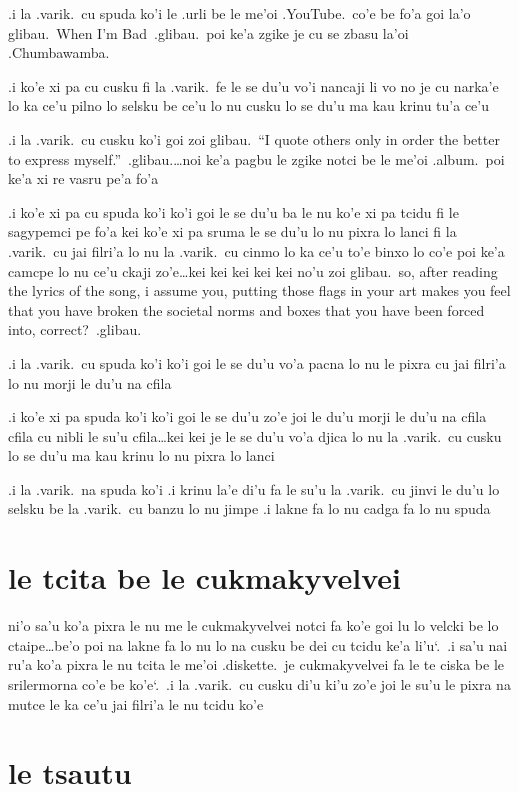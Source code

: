 \documentclass{report}
\newcommand\sds{\spacefactor\sfcode`.\ \space}
\begin{document}
.i la .varik.\ cu spuda ko'i le .urli be le me'oi .YouTube.\ co'e be fo'a goi la'o glibau.\ When I'm Bad\ .glibau.\ poi ke'a zgike je cu se zbasu la'oi .Chumbawamba.

.i ko'e xi pa cu cusku fi la .varik.\ fe le se du'u vo'i nancaji li vo no je cu narka'e lo ka ce'u pilno lo selsku be ce'u lo nu cusku lo se du'u ma kau krinu tu'a ce'u

.i la .varik.\ cu cusku ko'i goi zoi glibau.\ ``I quote others only in order the better to express myself.''\ .glibau.\ldots noi ke'a pagbu le zgike notci be le me'oi .album.\ poi ke'a xi re vasru pe'a fo'a

.i ko'e xi pa cu spuda ko'i ko'i goi le se du'u ba le nu ko'e xi pa tcidu fi le sagypemci pe fo'a kei ko'e xi pa sruma le se du'u lo nu pixra lo lanci fi la .varik.\ cu jai filri'a lo nu la .varik.\ cu cinmo lo ka ce'u to'e binxo lo co'e poi ke'a camcpe lo nu ce'u ckaji zo'e\ldots kei kei kei kei kei no'u zoi glibau.\ so, after reading the lyrics of the song, i assume you, putting those flags in your art makes you feel that you have broken the societal norms and boxes that you have been forced into, correct?\ .glibau.

.i la .varik.\ cu spuda ko'i ko'i goi le se du'u vo'a pacna lo nu le pixra cu jai filri'a lo nu morji le du'u na cfila

.i ko'e xi pa spuda ko'i ko'i goi le se du'u zo'e joi le du'u morji le du'u na cfila cfila cu nibli le su'u cfila\ldots kei kei je le se du'u vo'a djica lo nu la .varik.\ cu cusku lo se du'u ma kau krinu lo nu pixra lo lanci

.i la .varik.\ na spuda ko'i  .i krinu la'e di'u fa le su'u la .varik.\ cu jinvi le du'u lo selsku be la .varik.\ cu banzu lo nu jimpe  .i lakne fa lo nu cadga fa lo nu spuda

\section{le tcita be le cukmakyvelvei}
ni'o sa'u ko'a pixra le nu me le cukmakyvelvei notci fa ko'e goi lu lo velcki be lo ctaipe\ldots be'o poi na lakne fa lo nu lo na cusku be dei cu tcidu ke'a li'u\sds  .i sa'u nai ru'a ko'a pixra le nu tcita le me'oi .diskette.\ je cukmakyvelvei fa le te ciska be le srilermorna co'e be ko'e\sds  .i la .varik.\ cu cusku di'u ki'u zo'e joi le su'u le pixra na mutce le ka ce'u jai filri'a le nu tcidu ko'e

\section{le tsautu}
\end{document}
